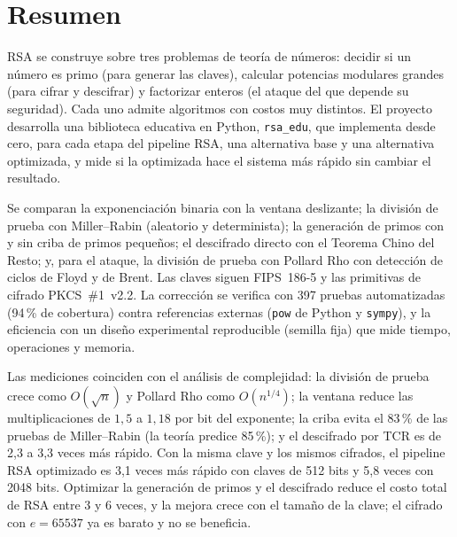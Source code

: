 \section{Resumen}
\label{sec:resumen}

RSA se construye sobre tres problemas de teoría de números: decidir si un
número es primo (para generar las claves), calcular potencias modulares
grandes (para cifrar y descifrar) y factorizar enteros (el ataque del que
depende su seguridad). Cada uno admite algoritmos con costos muy distintos. El
proyecto desarrolla una biblioteca educativa en Python, \texttt{rsa\_edu}, que
implementa desde cero, para cada etapa del pipeline RSA, una alternativa base y
una alternativa optimizada, y mide si la optimizada hace el sistema más rápido
sin cambiar el resultado.

Se comparan la exponenciación binaria con la ventana deslizante; la división
de prueba con Miller--Rabin (aleatorio y determinista); la generación de primos
con y sin criba de primos pequeños; el descifrado directo con el Teorema Chino
del Resto; y, para el ataque, la división de prueba con Pollard Rho con
detección de ciclos de Floyd y de Brent. Las claves siguen FIPS~186-5 y las
primitivas de cifrado PKCS~\#1~v2.2. La corrección se verifica con 397 pruebas
automatizadas (94\,\% de cobertura) contra referencias externas (\texttt{pow}
de Python y \texttt{sympy}), y la eficiencia con un diseño experimental
reproducible (semilla fija) que mide tiempo, operaciones y memoria.

Las mediciones coinciden con el análisis de complejidad: la división de prueba
crece como $O(\sqrt n)$ y Pollard Rho como $O(n^{1/4})$; la ventana reduce las
multiplicaciones de $1{,}5$ a $1{,}18$ por bit del exponente; la criba evita el
83\,\% de las pruebas de Miller--Rabin (la teoría predice 85\,\%); y el
descifrado por TCR es de 2,3 a 3,3 veces más rápido. Con la misma clave y los
mismos cifrados, el pipeline RSA optimizado es 3,1 veces más rápido con claves
de 512 bits y 5,8 veces con 2048 bits. Optimizar la generación de primos y el
descifrado reduce el costo total de RSA entre 3 y 6 veces, y la mejora crece
con el tamaño de la clave; el cifrado con $e = 65537$ ya es barato y no se
beneficia.
